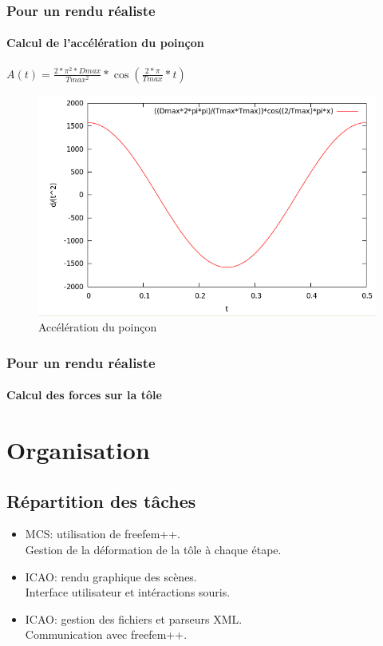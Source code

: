 \documentclass{beamer}
\begin{document}
\begin{frame}
    \frametitle{Pour un rendu réaliste}
    \framesubtitle{Calcul de l'accélération du poinçon}
    \begin{center}
        $A(t) = \frac{2*\pi^2*Dmax}{Tmax^2}*\cos(\frac{2*\pi}{Tmax}*t)$
    \end{center}
        \begin{figure}
            \includegraphics[width=.7\textwidth]{img/acceleration.png}
            \caption{Accélération du poinçon}
            \label{Accélération}
        \end{figure}
\end{frame}
\begin{frame}
    \frametitle{Pour un rendu réaliste}
    \framesubtitle{Calcul des forces sur la tôle}
\end{frame}

\section{Organisation}
\subsection{Répartition des tâches}
\begin{frame}
    \begin{itemize}
        \item MCS: utilisation de freefem++.\\
            Gestion de la déformation de la tôle à chaque étape.
        \item ICAO: rendu graphique des scènes.\\
        Interface utilisateur et intéractions souris.
        \item ICAO: gestion des fichiers et parseurs XML.\\
            Communication avec freefem++.
    \end{itemize}
\end{frame}
\end{document}
